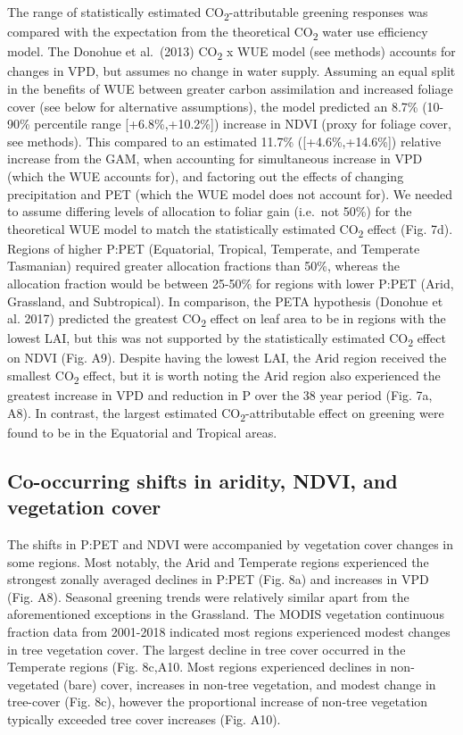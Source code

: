 \documentclass[
]{article}
\begin{document}
The range of statistically estimated CO\textsubscript{2}-attributable
greening responses was compared with the expectation from the
theoretical CO\textsubscript{2} water use efficiency model. The Donohue
et al.~(2013) CO\textsubscript{2} x WUE model (see methods) accounts for
changes in VPD, but assumes no change in water supply. Assuming an equal
split in the benefits of WUE between greater carbon assimilation and
increased foliage cover (see below for alternative assumptions), the
model predicted an 8.7\% (10-90\% percentile range {[}+6.8\%,+10.2\%{]})
increase in NDVI (proxy for foliage cover, see methods). This compared
to an estimated 11.7\% ({[}+4.6\%,+14.6\%{]}) relative increase from the
GAM, when accounting for simultaneous increase in VPD (which the WUE
accounts for), and factoring out the effects of changing precipitation
and PET (which the WUE model does not account for). We needed to assume
differing levels of allocation to foliar gain (i.e.~not 50\%) for the
theoretical WUE model to match the statistically estimated
CO\textsubscript{2} effect (Fig. 7d). Regions of higher P:PET
(Equatorial, Tropical, Temperate, and Temperate Tasmanian) required
greater allocation fractions than 50\%, whereas the allocation fraction
would be between 25-50\% for regions with lower P:PET (Arid, Grassland,
and Subtropical). In comparison, the PETA hypothesis (Donohue et al.
2017) predicted the greatest CO\textsubscript{2} effect on leaf area to
be in regions with the lowest LAI, but this was not supported by the
statistically estimated CO\textsubscript{2} effect on NDVI (Fig. A9).
Despite having the lowest LAI, the Arid region received the smallest
CO\textsubscript{2} effect, but it is worth noting the Arid region also
experienced the greatest increase in VPD and reduction in P over the 38
year period (Fig. 7a, A8). In contrast, the largest estimated
CO\textsubscript{2}-attributable effect on greening were found to be in
the Equatorial and Tropical areas.

\hypertarget{co-occurring-shifts-in-aridity-ndvi-and-vegetation-cover}{%
\subsection{Co-occurring shifts in aridity, NDVI, and vegetation
cover}\label{co-occurring-shifts-in-aridity-ndvi-and-vegetation-cover}}

The shifts in P:PET and NDVI were accompanied by vegetation cover
changes in some regions. Most notably, the Arid and Temperate regions
experienced the strongest zonally averaged declines in P:PET (Fig. 8a)
and increases in VPD (Fig. A8). Seasonal greening trends were relatively
similar apart from the aforementioned exceptions in the Grassland. The
MODIS vegetation continuous fraction data from 2001-2018 indicated most
regions experienced modest changes in tree vegetation cover. The largest
decline in tree cover occurred in the Temperate regions (Fig. 8c,A10.
Most regions experienced declines in non-vegetated (bare) cover,
increases in non-tree vegetation, and modest change in tree-cover (Fig.
8c), however the proportional increase of non-tree vegetation typically
exceeded tree cover increases (Fig. A10).
\end{document}
